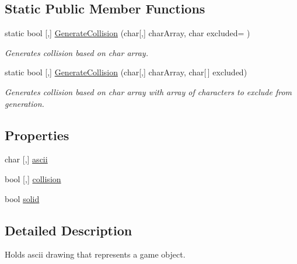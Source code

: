 \subsection*{Static Public Member Functions}
\begin{DoxyCompactItemize}
\item 
static bool \mbox{[},\mbox{]} \mbox{\hyperlink{class_retro_engine_1_1_a_s_c_i_i_sprite_ae42023edb94d02b6f5c89314ba96c85c}{Generate\+Collision}} (char\mbox{[},\mbox{]} char\+Array, char excluded=\textquotesingle{} \textquotesingle{})
\begin{DoxyCompactList}\small\item\em Generates collision based on char array. \end{DoxyCompactList}\item 
static bool \mbox{[},\mbox{]} \mbox{\hyperlink{class_retro_engine_1_1_a_s_c_i_i_sprite_a3251ceca85408863040aafdc8802e09c}{Generate\+Collision}} (char\mbox{[},\mbox{]} char\+Array, char\mbox{[}$\,$\mbox{]} excluded)
\begin{DoxyCompactList}\small\item\em Generates collision based on char array with array of characters to exclude from generation. \end{DoxyCompactList}\end{DoxyCompactItemize}
\subsection*{Properties}
\begin{DoxyCompactItemize}
\item 
char \mbox{[},\mbox{]} \mbox{\hyperlink{class_retro_engine_1_1_a_s_c_i_i_sprite_a46cac35f5e76c14d52a3e5cb6e6e9086}{ascii}}
\item 
bool \mbox{[},\mbox{]} \mbox{\hyperlink{class_retro_engine_1_1_a_s_c_i_i_sprite_af59bbd2956a9d63025bd945adc58fac8}{collision}}
\item 
bool \mbox{\hyperlink{class_retro_engine_1_1_a_s_c_i_i_sprite_ad635c91ad22aede8bd6a74d2a64f4e27}{solid}}
\end{DoxyCompactItemize}


\subsection{Detailed Description}
Holds ascii drawing that represents a game object. 



